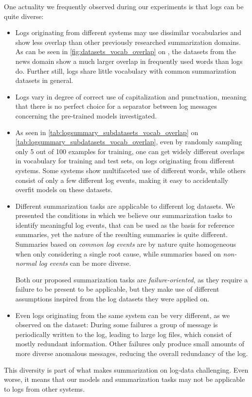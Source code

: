 One actuality we frequently observed during our experiments is that logs can be quite diverse:
\begin{itemize}
\item Logs originating from different systems may use dissimilar vocabularies
      and show less overlap than other previously researched summarization domains.
      As can be seen in \autoref{fig:datasets_vocab_overlap} on ,
      the datasets from the news domain show a much larger overlap in frequently used words than logs do.
      Further still, logs share little vocabulary with common summarization datasets in general.
\item Logs vary in degree of correct use of capitalization and punctuation,
      meaning that there is no perfect choice for a separator between log messages concerning the pre-trained models investigated.
\item As seen in \autoref{tab:logsummary_subdatasets_vocab_overlap} on \autoref{tab:logsummary_subdatasets_vocab_overlap},
      even by randomly sampling only 5 out of 100 examples for training,
      one can get widely different overlaps in vocabulary for training and test sets,
      on logs originating from different systems.
      Some systems show multifaceted use of different words, while others consist of only a few different log events,
      making it easy to accidentally overfit models on these datasets.
\item Different summarization tasks are applicable to different log datasets.
      We presented the conditions in which we believe our summarization tasks to identify meaningful log events,
      that can be used as the basis for reference summaries,
      yet the nature of the resulting summaries is quite different.
      Summaries based on \emph{common log events} are by nature quite homogeneous when only considering a single root cause,
      while summaries based on \emph{non-normal log events} can be more diverse.

      Both our proposed summarization tasks are \emph{failure-oriented},
      as they require a failure to be present to be applicable,
      but they make use of different assumptions inspired from the log datasets they were applied on.
\item Even logs originating from the same system can be very different,
      as we observed on the \hadoop{} dataset:
      During some failures a group of message is periodically written to the log, leading to large log files,
      which consist of mostly redundant information.
      Other failures only produce small amounts of more diverse anomalous messages, reducing the overall redundancy of the log.
\end{itemize}
This diversity is part of what makes summarization on log-data challenging.
Even worse, it means that our models and summarization tasks may not be applicable to logs from other systems.

